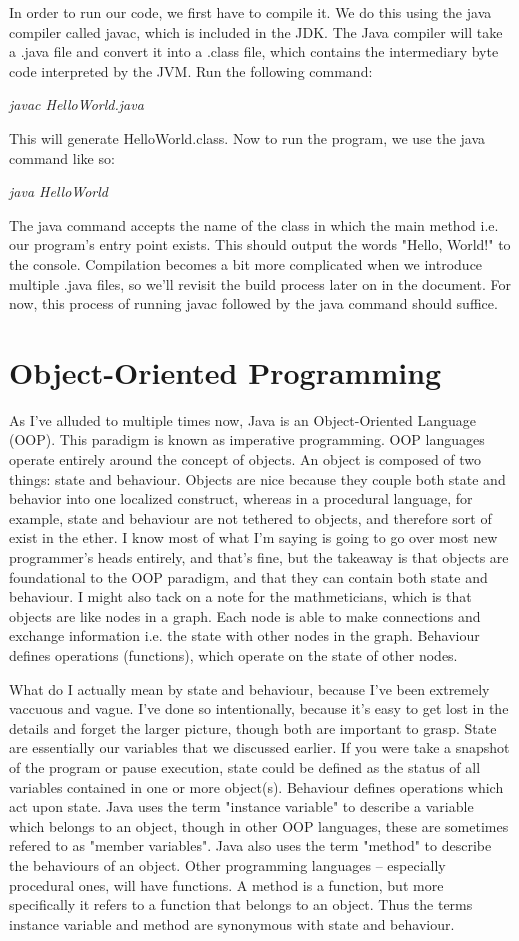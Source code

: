\documentclass{article}
\begin{document}
In order to run our code, we first have to compile it. We do this using the java compiler called javac, which
is included in the JDK. The Java compiler will take a .java file and convert it into a .class file, which
contains the intermediary byte code interpreted by the JVM. Run the following command:

\emph{javac HelloWorld.java}

This will generate HelloWorld.class. Now to run the program, we use the java command like so:

\emph{java HelloWorld}

The java command accepts the name of the class in which the main method i.e. our program’s entry point exists.
This should output the words "Hello, World!" to the console. Compilation becomes a bit more complicated when
we introduce multiple .java files, so we’ll revisit the build process later on in the document. For now, this
process of running javac followed by the java command should suffice.

\section{Object-Oriented Programming}

As I’ve alluded to multiple times now, Java is an Object-Oriented Language (OOP). This paradigm is known as
imperative programming. OOP languages operate entirely around the concept of objects. An object is composed of
two things: state and behaviour. Objects are nice because they couple both state and behavior into one localized
construct, whereas in a procedural language, for example, state and behaviour are not tethered to objects, and
therefore sort of exist in the ether. I know most of what I’m saying is going to go over most new programmer’s
heads entirely, and that’s fine, but the takeaway is that objects are foundational to the OOP paradigm, and
that they can contain both state and behaviour. I might also tack on a note for the mathmeticians, which is
that objects are like nodes in a graph. Each node is able to make connections and exchange information i.e.
the state with other nodes in the graph. Behaviour defines operations (functions), which operate on the state of
other nodes.

What do I actually mean by state and behaviour, because I’ve been extremely vaccuous and vague. I’ve done so
intentionally, because it’s easy to get lost in the details and forget the larger picture, though both are
important to grasp. State are essentially our variables that we discussed earlier. If you were take a snapshot
of the program or pause execution, state could be defined as the status of all variables contained in one or
more object(s). Behaviour defines operations which act upon state. Java uses the term "instance variable" to
describe a variable which belongs to an object, though in other OOP languages, these are sometimes refered to
as "member variables". Java also uses the term "method" to describe the behaviours of an object. Other
programming languages – especially procedural ones, will have functions. A method is a function, but more
specifically it refers to a function that belongs to an object. Thus the terms instance variable and method
are synonymous with state and behaviour.
\end{document}
